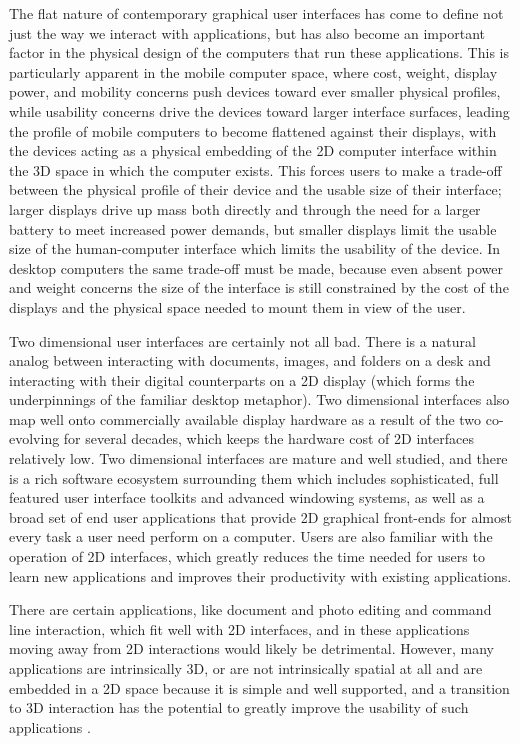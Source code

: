 The flat nature of contemporary graphical user interfaces has come to define not just the way we interact with applications, but has also become an important factor in the physical design of the computers that run these applications. This is particularly apparent in the mobile computer space, where cost, weight, display power, and mobility concerns push devices toward ever smaller physical profiles, while usability concerns drive the devices toward larger interface surfaces, leading the profile of mobile computers to become flattened against their displays, with the devices acting as a physical embedding of the 2D computer interface within the 3D space in which the computer exists. This forces users to make a trade-off between the physical profile of their device and the usable size of their interface; larger displays drive up mass both directly and through the need for a larger battery to meet increased power demands, but smaller displays limit the usable size of the human-computer interface which limits the usability of the device. In desktop computers the same trade-off must be made, because even absent power and weight concerns the size of the interface is still constrained by the cost of the displays and the physical space needed to mount them in view of the user.

Two dimensional user interfaces are certainly not all bad. There is a natural analog between interacting with documents, images, and folders on a desk and interacting with their digital counterparts on a 2D display (which forms the underpinnings of the familiar desktop metaphor). Two dimensional interfaces also map well onto commercially available display hardware as a result of the two co-evolving for several decades, which keeps the hardware cost of 2D interfaces relatively low. Two dimensional interfaces are mature and well studied, and there is a rich software ecosystem surrounding them which includes sophisticated, full featured user interface toolkits and advanced windowing systems, as well as a broad set of end user applications that provide 2D graphical front-ends for almost every task a user need perform on a computer. Users are also familiar with the operation of 2D interfaces, which greatly reduces the time needed for users to learn new applications and improves their productivity with existing applications. 

There are certain applications, like document and photo editing and command line interaction, which fit well with 2D interfaces, and in these applications moving away from 2D interactions would likely be detrimental. However, many applications are intrinsically 3D, or are not intrinsically spatial at all and are embedded in a 2D space because it is simple and well supported, and a transition to 3D interaction has the potential to greatly improve  the usability of such applications \cite{bowman_theory_practice}.

